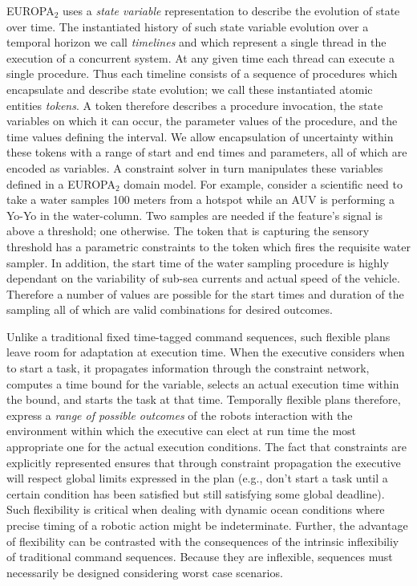 EUROPA$_2$ uses a \emph{state variable} representation to describe the
evolution of state over time. The instantiated history of such state
variable evolution over a temporal horizon we call \emph{timelines}
and which represent a single thread in the execution of a concurrent
system. At any given time each thread can execute a single procedure.
Thus each timeline consists of a sequence of procedures which
encapsulate and describe state evolution; we call these instantiated
atomic entities \emph{tokens}.  A token therefore describes a
procedure invocation, the state variables on which it can occur, the
parameter values of the procedure, and the time values defining the
interval. We allow encapsulation of uncertainty within these tokens
with a range of start and end times and parameters, all of which are
encoded as variables. A constraint solver in turn manipulates these
variables defined in a EUROPA$_2$ domain model. For example, consider
a scientific need to take a water samples 100 meters from a hotspot
while an AUV is performing a Yo-Yo in the water-column. Two samples
are needed if the feature's signal is above a threshold; one
otherwise. The token that is capturing the sensory threshold has a
parametric constraints to the token which fires the requisite water
sampler. In addition, the start time of the water sampling procedure
is highly dependant on the variability of sub-sea currents and actual
speed of the vehicle. Therefore a number of values are possible for
the start times and duration of the sampling all of which are valid
combinations for desired outcomes.

Unlike a traditional fixed time-tagged command sequences, such
flexible plans leave room for adaptation at execution time. When the
executive considers when to start a task, it propagates information
through the constraint network, computes a time bound for the
variable, selects an actual execution time within the bound, and
starts the task at that time. Temporally flexible plans therefore,
express a \textit{range of possible outcomes} of the robots
interaction with the environment within which the executive can elect
at run time the most appropriate one for the actual execution
conditions. The fact that constraints are explicitly represented
ensures that through constraint propagation the executive will respect
global limits expressed in the plan (e.g., don't start a task until a
certain condition has been satisfied but still satisfying some global
deadline). Such flexibility is critical when dealing with dynamic
ocean conditions where precise timing of a robotic action might be
indeterminate. Further, the advantage of flexibility can be contrasted
with the consequences of the intrinsic inflexibiliy of traditional
command sequences. Because they are inflexible, sequences must
necessarily be designed considering worst case scenarios.



